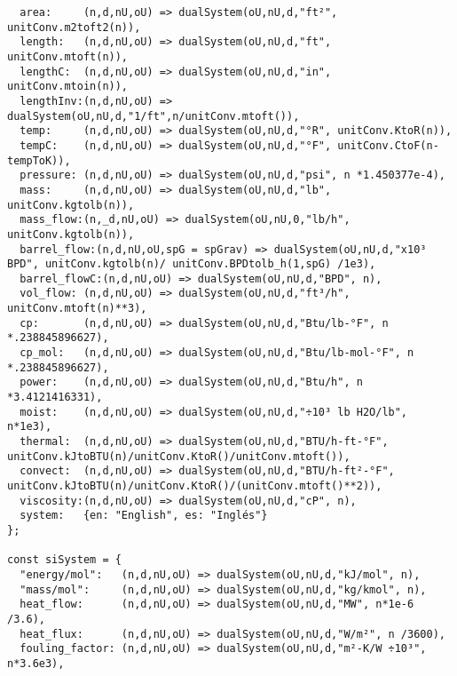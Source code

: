 \begin{verbatim}
  area:     (n,d,nU,oU) => dualSystem(oU,nU,d,"ft²", unitConv.m2toft2(n)),
  length:   (n,d,nU,oU) => dualSystem(oU,nU,d,"ft", unitConv.mtoft(n)),
  lengthC:  (n,d,nU,oU) => dualSystem(oU,nU,d,"in", unitConv.mtoin(n)),
  lengthInv:(n,d,nU,oU) => dualSystem(oU,nU,d,"1/ft",n/unitConv.mtoft()),
  temp:     (n,d,nU,oU) => dualSystem(oU,nU,d,"°R", unitConv.KtoR(n)),
  tempC:    (n,d,nU,oU) => dualSystem(oU,nU,d,"°F", unitConv.CtoF(n-tempToK)),
  pressure: (n,d,nU,oU) => dualSystem(oU,nU,d,"psi", n *1.450377e-4),
  mass:     (n,d,nU,oU) => dualSystem(oU,nU,d,"lb", unitConv.kgtolb(n)),
  mass_flow:(n,_d,nU,oU) => dualSystem(oU,nU,0,"lb/h", unitConv.kgtolb(n)),
  barrel_flow:(n,d,nU,oU,spG = spGrav) => dualSystem(oU,nU,d,"x10³ BPD", unitConv.kgtolb(n)/ unitConv.BPDtolb_h(1,spG) /1e3),
  barrel_flowC:(n,d,nU,oU) => dualSystem(oU,nU,d,"BPD", n),
  vol_flow: (n,d,nU,oU) => dualSystem(oU,nU,d,"ft³/h", unitConv.mtoft(n)**3),
  cp:       (n,d,nU,oU) => dualSystem(oU,nU,d,"Btu/lb-°F", n *.238845896627),
  cp_mol:   (n,d,nU,oU) => dualSystem(oU,nU,d,"Btu/lb-mol-°F", n *.238845896627),
  power:    (n,d,nU,oU) => dualSystem(oU,nU,d,"Btu/h", n *3.4121416331),
  moist:    (n,d,nU,oU) => dualSystem(oU,nU,d,"÷10³ lb H2O/lb", n*1e3),
  thermal:  (n,d,nU,oU) => dualSystem(oU,nU,d,"BTU/h-ft-°F", unitConv.kJtoBTU(n)/unitConv.KtoR()/unitConv.mtoft()),
  convect:  (n,d,nU,oU) => dualSystem(oU,nU,d,"BTU/h-ft²-°F", unitConv.kJtoBTU(n)/unitConv.KtoR()/(unitConv.mtoft()**2)),
  viscosity:(n,d,nU,oU) => dualSystem(oU,nU,d,"cP", n),
  system:   {en: "English", es: "Inglés"}
};

const siSystem = {
  "energy/mol":   (n,d,nU,oU) => dualSystem(oU,nU,d,"kJ/mol", n),
  "mass/mol":     (n,d,nU,oU) => dualSystem(oU,nU,d,"kg/kmol", n),
  heat_flow:      (n,d,nU,oU) => dualSystem(oU,nU,d,"MW", n*1e-6 /3.6),
  heat_flux:      (n,d,nU,oU) => dualSystem(oU,nU,d,"W/m²", n /3600),
  fouling_factor: (n,d,nU,oU) => dualSystem(oU,nU,d,"m²-K/W ÷10³", n*3.6e3),


\end{verbatim}
